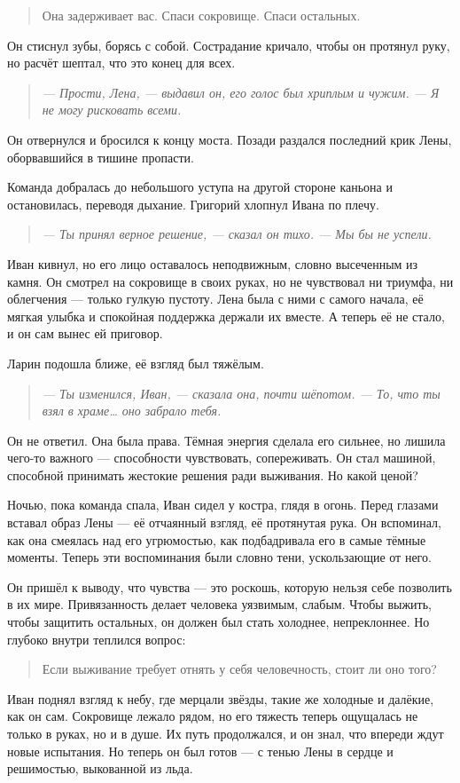 \documentclass[12pt,a4paper]{book}
\newenvironment{dialogue}{\begin{quote}\itshape}{\end{quote}} %
\begin{document}
\begin{quote}
Она задерживает вас. Спаси сокровище. Спаси остальных.
\end{quote}

Он стиснул зубы, борясь с собой. Сострадание кричало, чтобы он протянул руку, но расчёт шептал, что это конец для всех.

\begin{dialogue}
--- Прости, Лена, --- выдавил он, его голос был хриплым и чужим. --- Я не могу рисковать всеми.
\end{dialogue}

Он отвернулся и бросился к концу моста. Позади раздался последний крик Лены, оборвавшийся в тишине пропасти.

Команда добралась до небольшого уступа на другой стороне каньона и остановилась, переводя дыхание. Григорий хлопнул Ивана по плечу.

\begin{dialogue}
--- Ты принял верное решение, --- сказал он тихо. --- Мы бы не успели.
\end{dialogue}

Иван кивнул, но его лицо оставалось неподвижным, словно высеченным из камня. Он смотрел на сокровище в своих руках, но не чувствовал ни триумфа, ни облегчения --- только гулкую пустоту. Лена была с ними с самого начала, её мягкая улыбка и спокойная поддержка держали их вместе. А теперь её не стало, и он сам вынес ей приговор.

Ларин подошла ближе, её взгляд был тяжёлым.

\begin{dialogue}
--- Ты изменился, Иван, --- сказала она, почти шёпотом. --- То, что ты взял в храме… оно забрало тебя.
\end{dialogue}

Он не ответил. Она была права. Тёмная энергия сделала его сильнее, но лишила чего-то важного --- способности чувствовать, сопереживать. Он стал машиной, способной принимать жестокие решения ради выживания. Но какой ценой?

Ночью, пока команда спала, Иван сидел у костра, глядя в огонь. Перед глазами вставал образ Лены --- её отчаянный взгляд, её протянутая рука. Он вспоминал, как она смеялась над его угрюмостью, как подбадривала его в самые тёмные моменты. Теперь эти воспоминания были словно тени, ускользающие от него.

Он пришёл к выводу, что чувства --- это роскошь, которую нельзя себе позволить в их мире. Привязанность делает человека уязвимым, слабым. Чтобы выжить, чтобы защитить остальных, он должен был стать холоднее, непреклоннее. Но глубоко внутри теплился вопрос:

\begin{quote}
Если выживание требует отнять у себя человечность, стоит ли оно того?
\end{quote}

Иван поднял взгляд к небу, где мерцали звёзды, такие же холодные и далёкие, как он сам. Сокровище лежало рядом, но его тяжесть теперь ощущалась не только в руках, но и в душе. Их путь продолжался, и он знал, что впереди ждут новые испытания. Но теперь он был готов --- с тенью Лены в сердце и решимостью, выкованной из льда.
\end{document}
